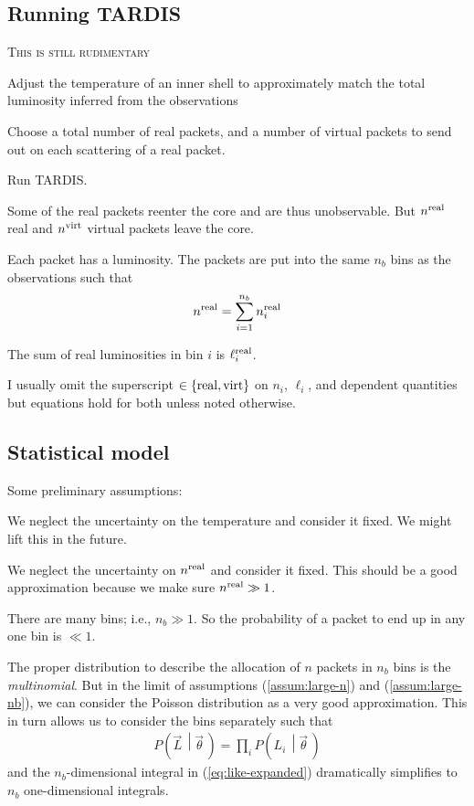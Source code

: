 \documentclass[a4,12pt]{article}
\newcommand{\given}[2]{\left(#1\, \middle| #2 \, \right)}
\newcommand{\lumi}{\ensuremath{\ell_i}}
\newcommand{\real}{\ensuremath{{\rm real}}}
\newcommand{\virt}{\ensuremath{{\rm virt}}}
\newcommand{\vecL}{\ensuremath{\vec{L}}}
\newcommand{\vecth}{\ensuremath{{\vec{\theta}}}}
\def \refeq#1{(\ref{eq:#1})}
\newcommand{\todo}[1]{{\textsc{\color{red}#1}}}
\newcommand{\tardis}{TARDIS}
\begin{document}
\subsection{Running \tardis}
\todo{This is still rudimentary}
\begin{compactenum}[(I)]
  \item Adjust the temperature of an inner shell to approximately match
    the total luminosity inferred from the observations
  \item Choose a total number of real packets, and a number of virtual
    packets to send out on each scattering of a real packet.
  \item Run \tardis.
  \item Some of the real packets reenter the core and are thus
    unobservable. But $n^\real$ real and $n^\virt$ virtual packets
    leave the core.
  \item Each packet has a luminosity. The packets are put into the
    same $n_b$ bins as the observations such that
    \begin{align}
      \label{eq:bin-packets}
      n^\real = \sum_{i=1}^{n_b} n_i^\real
    \end{align}
  \item The sum of real luminosities in bin $i$ is $\lumi^\real$.
\end{compactenum}
I usually omit the superscript $\in \{\real, \virt\}$ on $n_i$,
$\lumi$, and dependent quantities but equations hold for both unless
noted otherwise.

\subsection{Statistical model}

Some preliminary assumptions:
\begin{compactenum}[(a)]
  \item We neglect the uncertainty on the temperature and consider it
    fixed. We might lift this in the future.
  \item \label{assum:large-n} We neglect the uncertainty on $n^\real$ and consider it
    fixed. This should be a good approximation because we make sure
    $n^\real \gg 1$.
  \item \label{assum:large-nb} There are many bins; i.e., $n_b \gg 1$. So the probability of
    a packet to end up in any one bin is $\ll 1$.
\end{compactenum}
The proper distribution to describe the allocation of $n$ packets in
$n_b$ bins is the \emph{multinomial}. But in the limit of assumptions
(\ref{assum:large-n}) and (\ref{assum:large-nb}), we can consider the
Poisson distribution as a very good approximation. This in turn allows
us to consider the bins separately such that
\begin{align}
  \label{eq:factor-L}
  P\given{\vecL}{\vecth} = \prod_i P\given{L_i}{\vecth}
\end{align}
and the $n_b$-dimensional integral in \refeq{like-expanded}
dramatically simplifies to $n_b$ one-dimensional integrals.
\end{document}
